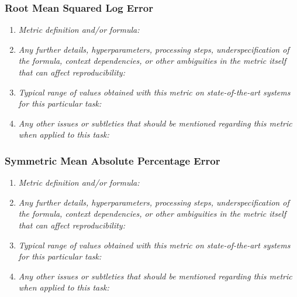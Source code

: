 \documentclass[a4paper,11pt]{article}
\begin{document}
        \subsubsection{Root Mean Squared Log Error}
            \begin{enumerate}[label=\alph*.]
                \item \textit{Metric definition and/or formula:}
                \bigskip
                \item \textit{Any further details, hyperparameters, processing steps, underspecification of the formula, context dependencies, or other ambiguities in the metric itself that can affect reproducibility:}
                \bigskip
                \item \textit{Typical range of values obtained with this metric on state-of-the-art systems for this particular task:}
                \bigskip
                \item \textit{Any other issues or subtleties that should be mentioned regarding this metric when applied to this task:}
                \bigskip
            \end{enumerate}
        \subsubsection{Symmetric Mean Absolute Percentage Error}
            \begin{enumerate}[label=\alph*.]
                \item \textit{Metric definition and/or formula:}
                \bigskip
                \item \textit{Any further details, hyperparameters, processing steps, underspecification of the formula, context dependencies, or other ambiguities in the metric itself that can affect reproducibility:}
                \bigskip
                \item \textit{Typical range of values obtained with this metric on state-of-the-art systems for this particular task:}
                \bigskip
                \item \textit{Any other issues or subtleties that should be mentioned regarding this metric when applied to this task:}
                \bigskip
            \end{enumerate}
\end{document}
